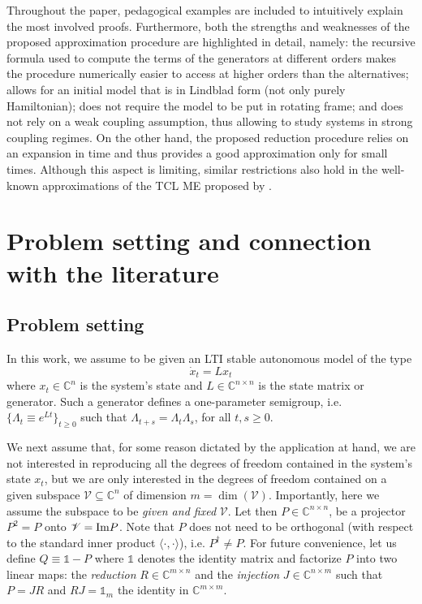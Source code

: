\documentclass[twocolumn]{autart}    %
\newcommand{\Vs}{\mathscr{V}}
\newcommand{\Cb}{\mathbb{C}}
\newcommand{\one}{\mathbb{1}}
\begin{document}
Throughout the paper, pedagogical examples are included to intuitively explain the most involved proofs. Furthermore, both the strengths and weaknesses of the proposed approximation procedure are highlighted in detail, namely: the recursive formula used to compute the terms of the generators at different orders makes the procedure numerically easier to access at higher orders than the alternatives; allows for an initial model that is in Lindblad form (not only purely Hamiltonian); does not require the model to be put in rotating frame; and does not rely on a weak coupling assumption, thus allowing to study systems in strong coupling regimes. On the other hand, the proposed reduction procedure relies on an expansion in time and thus provides a good approximation only for small times. Although this aspect is limiting, similar restrictions also hold in the well-known approximations of the TCL ME proposed by \cite{shibata_generalized_1977}.

\section{Problem setting and connection with the literature}
\label{sec:problem_setting}
\subsection{Problem setting}

In this work, we assume to be given an LTI stable autonomous model of the type 
\begin{equation}
    \dot{x}_t = L x_t
    \label{eq:original_model_linear}
\end{equation}
where $x_t\in\Cb^n$ is the system's state and $L\in\Cb^{n\times n}$ is the state matrix or generator. Such a generator defines a one-parameter semigroup, i.e. $\{\Lambda_t \equiv e^{L t}\}_{t\geq 0}$ such that $\Lambda_{t+s} =\Lambda_t\Lambda_s$, for all $t,s\geq0$.

We next assume that, for some reason dictated by the application at hand, we are not interested in reproducing all the degrees of freedom contained in the system's state $x_t$, but we are only interested in the degrees of freedom contained on a given subspace $\Vs\subseteq\Cb^n$ of dimension $m=\dim(\Vs)$. Importantly, here we assume the subspace to be {\em given and fixed} $\Vs$.
Let then $P\in\Cb^{n\times n}$, be a projector $P^2=P$ onto $\Vs={\rm Im}P$. Note that $P$ does not need to be orthogonal (with respect to the standard inner product $\langle\cdot,\cdot\rangle$), i.e. $P^\dag \neq P$. For future convenience, let us define $Q\equiv \one-P$ where $\one$ denotes the identity matrix and factorize $P$ into two linear maps: the {\em reduction} $R\in\Cb^{m\times n}$ and the {\em injection} $J\in\Cb^{n\times m}$ such that $P=JR$ and $RJ = \one_m$ the identity in $\Cb^{m\times m}$. 
\end{document}
